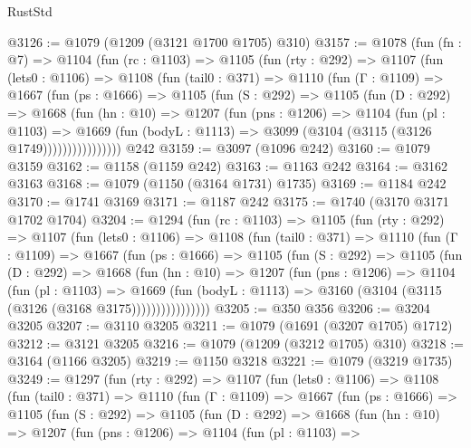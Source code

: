 \begin{lexlean}{RustStd}
\begin{coremodule}
@3126 := @1079 (@1209 (@3121 @1700 @1705) @310)
@3157 := @1078
    (fun (fn : @7) =>
    @1104
      (fun (rc : @1103) =>
      @1105
        (fun (rty : @292) =>
        @1107
          (fun (lets0 : @1106) =>
          @1108
            (fun (tail0 : @371) =>
            @1110
              (fun (Γ : @1109) =>
              @1667
                (fun (ps : @1666) =>
                @1105
                  (fun (S : @292) =>
                  @1105
                    (fun (D : @292) =>
                    @1668
                      (fun (hn : @10) =>
                      @1207
                        (fun (pns : @1206) =>
                        @1104
                          (fun (pl : @1103) =>
                          @1669
                            (fun (bodyL : @1113) => @3099 (@3104 (@3115 (@3126 @1749))))))))))))))))
    @242
@3159 := @3097 (@1096 @242)
@3160 := @1079 @3159
@3162 := @1158 (@1159 @242)
@3163 := @1163 @242
@3164 := @3162 @3163
@3168 := @1079 (@1150 (@3164 @1731) @1735)
@3169 := @1184 @242
@3170 := @1741 @3169
@3171 := @1187 @242
@3175 := @1740 (@3170 @3171 @1702 @1704)
@3204 := @1294
    (fun (rc : @1103) =>
    @1105
      (fun (rty : @292) =>
      @1107
        (fun (lets0 : @1106) =>
        @1108
          (fun (tail0 : @371) =>
          @1110
            (fun (Γ : @1109) =>
            @1667
              (fun (ps : @1666) =>
              @1105
                (fun (S : @292) =>
                @1105
                  (fun (D : @292) =>
                  @1668
                    (fun (hn : @10) =>
                    @1207
                      (fun (pns : @1206) =>
                      @1104
                        (fun (pl : @1103) =>
                        @1669
                          (fun (bodyL : @1113) =>
                          @3160 (@3104 (@3115 (@3126 (@3168 @3175))))))))))))))))
@3205 := @350 @356
@3206 := @3204 @3205
@3207 := @3110 @3205
@3211 := @1079 (@1691 (@3207 @1705) @1712)
@3212 := @3121 @3205
@3216 := @1079 (@1209 (@3212 @1705) @310)
@3218 := @3164 (@1166 @3205)
@3219 := @1150 @3218
@3221 := @1079 (@3219 @1735)
@3249 := @1297
    (fun (rty : @292) =>
    @1107
      (fun (lets0 : @1106) =>
      @1108
        (fun (tail0 : @371) =>
        @1110
          (fun (Γ : @1109) =>
          @1667
            (fun (ps : @1666) =>
            @1105
              (fun (S : @292) =>
              @1105
                (fun (D : @292) =>
                @1668
                  (fun (hn : @10) =>
                  @1207
                    (fun (pns : @1206) =>
                    @1104
                      (fun (pl : @1103) =>

\end{coremodule}
\end{lexlean}

